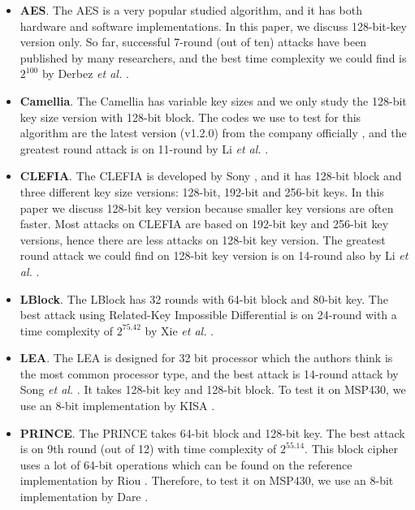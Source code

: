 \documentclass[sigconf, review=false]{acmart}
\begin{document}
\begin{itemize}
    \item
\textbf{AES}. The AES \cite{pub2001197} is a very popular studied algorithm, and it has both hardware and software implementations.
In this paper, we discuss 128-bit-key version only. So far, successful 7-round (out of ten) attacks have been published by many researchers,
and the best time complexity we could find is $2^{100}$ by Derbez \textit{et al.} \cite{derbez2013improved}.

    \item
\textbf{Camellia}. The Camellia \cite{aoki2000camellia} has variable key sizes and we only study the 128-bit key size version with 128-bit block.
The codes we use to test for this algorithm are the latest version (v1.2.0) from the company officially \cite{ntt2007},
and the greatest round attack is on 11-round by Li \textit{et al.} \cite{li2015meet}.

    \item
\textbf{CLEFIA}. The CLEFIA \cite{shirai2007128} is developed by Sony \cite{sony2008},
and it has 128-bit block and three different key size versions: 128-bit, 192-bit and 256-bit keys.
In this paper we discuss 128-bit key version because smaller key versions are often faster.
Most attacks on CLEFIA are based on 192-bit key and 256-bit key versions, hence there are less attacks on 128-bit key version.
The greatest round attack we could find on 128-bit key version is on 14-round also by Li \textit{et al.} \cite{li2015meet}.

    \item
\textbf{LBlock}. The LBlock \cite{wu2011lblock} has 32 rounds with 64-bit block and 80-bit key.
The best attack using Related-Key Impossible Differential is on 24-round with a time complexity of $2^{75.42}$ by Xie \textit{et al.} \cite{xie2017related}.

    \item
\textbf{LEA}. The LEA \cite{hong2013lea} is designed for 32 bit processor which the authors think is the most common processor type,
and the best attack is 14-round attack by Song \textit{et al.} \cite{song2016automatic}.
It takes 128-bit key and 128-bit block. To test it on MSP430, we use an 8-bit implementation by KISA \cite{kisa2015}.

    \item
\textbf{PRINCE}. The PRINCE \cite{borghoff2012prince} takes 64-bit block and 128-bit key.
The best attack is on 9th round (out of 12) with time complexity of $2^{55.14}$.
This block cipher uses a lot of 64-bit operations which can be found on the reference implementation by Riou \cite{sebastienriou2016}.
Therefore, to test it on MSP430, we use an 8-bit implementation by Dare \cite{chrisdare2016}.


\end{itemize}
\end{document}
